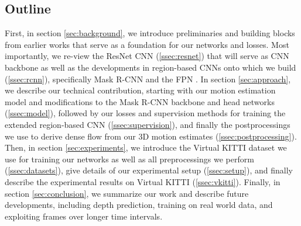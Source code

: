 \subsection{Outline}
First, in section \ref{sec:background}, we introduce preliminaries and building
blocks from earlier works that serve as a foundation for our networks and losses.
Most importantly, we re-view the ResNet CNN (\ref{ssec:resnet}) that will serve as CNN backbone
as well as the developments in region-based CNNs onto which we build (\ref{ssec:rcnn}),
specifically Mask R-CNN and the FPN \cite{FPN}.
In section \ref{sec:approach}, we describe our technical contribution, starting
with our motion estimation model and modifications to the Mask R-CNN backbone and head networks (\ref{ssec:model}),
followed by our losses and supervision methods for training
the extended region-based CNN (\ref{ssec:supervision}), and
finally the postprocessings we use to derive dense flow from our 3D motion estimates
(\ref{ssec:postprocessing}).
Then, in section \ref{sec:experiments}, we introduce the Virtual KITTI dataset we use
for training our networks as well as all preprocessings we perform (\ref{ssec:datasets}),
give details of our experimental setup (\ref{ssec:setup}),
and finally describe the experimental results
on Virtual KITTI (\ref{ssec:vkitti}).
Finally, in section \ref{sec:conclusion}, we summarize our work and describe future
developments, including depth prediction, training on real world data,
and exploiting frames over longer time intervals.
